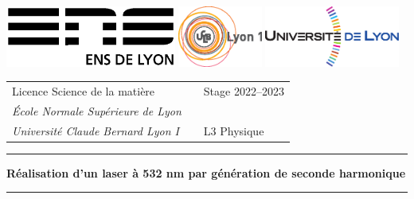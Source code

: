 \documentclass[11pt,a4paper]{article}
\begin{document}
\setlength{\parindent}{0pt}

\hypersetup{pageanchor=false}
\thispagestyle{empty}

\begin{@empty}

\includegraphics[height=2cm]{logoens.eps} \hfill \includegraphics[height=2cm]{logoucbl.eps} \hfill \includegraphics[height=2cm]{logounivlyon.eps}

\vspace{0.5cm}

\begin{tabularx}{\textwidth}{@{} l X l @{} }
{\sc Licence Science de la matière} 	&	& Stage 2022--2023 \\
{\it \'Ecole Normale Sup\'erieure de Lyon}		&	&  \\
{\it Universit\'e Claude Bernard Lyon I}		& 	& L3 Physique
\end{tabularx}

\begin{center}

\vspace{1.5cm}

\rule[11pt]{5cm}{0.5pt}

\textbf{\huge Réalisation d'un laser à 532 nm par génération de seconde harmonique}

\rule{5cm}{0.5pt}

\vspace{1.5cm}


\end{center}
\end{@empty}
\end{document}
